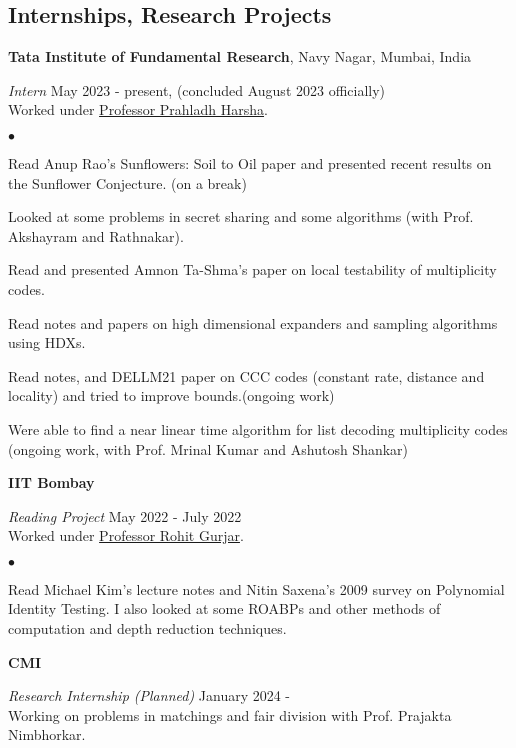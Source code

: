 \documentclass[margin,line, 10pt]{res}
\newenvironment{list2}{
  \begin{list}{$\bullet$}{%
      \setlength{\itemsep}{0in}
      \setlength{\parsep}{0in} \setlength{\parskip}{0in}
      \setlength{\topsep}{0in} \setlength{\partopsep}{0in} 
      \setlength{\leftmargin}{0.2in}}}{\end{list}}
\begin{document}
\begin{resume}
\section{\sc Internships, Research Projects}
{\bf Tata Institute of Fundamental Research}, Navy Nagar, Mumbai, India

\vspace{-.3cm}
{\em Intern} \hfill {May 2023 - present, (concluded August 2023 officially)}\\
Worked under \href{https://www.tifr.res.in/~prahladh/}{Professor Prahladh Harsha}.

\vspace*{.05in}  
\begin{list2}
\item Read Anup Rao's Sunflowers: Soil to Oil paper and presented recent results on the Sunflower Conjecture. (on a break)
\item Looked at some problems in secret sharing and some algorithms (with Prof. Akshayram and Rathnakar).
\item Read and presented Amnon Ta-Shma's paper on local testability of multiplicity codes.
\item Read notes and papers on high dimensional expanders and sampling algorithms using HDXs.
\item Read notes, and DELLM21 paper on CCC codes (constant rate, distance and locality) and tried to improve bounds.(ongoing work)
\item Were able to find a near linear time algorithm for list decoding multiplicity codes (ongoing work, with Prof. Mrinal Kumar and Ashutosh Shankar)
\end{list2}

\eject
{\bf IIT Bombay}

\vspace{-.3cm}
{\em Reading Project} \hfill {May 2022 - July 2022}\\
Worked under \href{https://www.cse.iitb.ac.in/~rgurjar/}{Professor Rohit Gurjar}.

\vspace*{.05in}  
\begin{list2}
\item Read Michael Kim's lecture notes and Nitin Saxena's 2009 survey on Polynomial Identity Testing. I also looked at some ROABPs and other methods of computation and depth reduction techniques.
\end{list2}

{\bf CMI}

\vspace{-.3cm}
{\em Research Internship (Planned)} \hfill {January 2024 - }\\
Working on problems in matchings and fair division with Prof. Prajakta Nimbhorkar. 

\end{resume}
\end{document}
